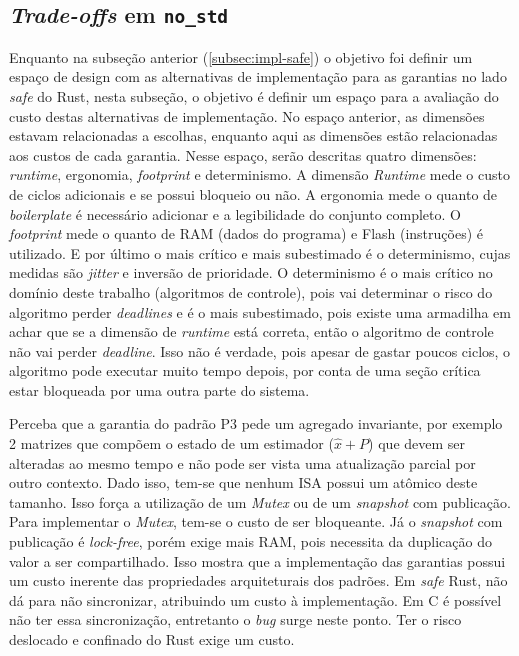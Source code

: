 \subsection{\textit{Trade-offs} em \texttt{no\_std}}
\label{subsec:cost-impl}

Enquanto na subseção anterior (\ref{subsec:impl-safe}) o objetivo foi definir um espaço de design com as alternativas de implementação para as garantias no lado \textit{safe} do Rust, nesta subseção, o objetivo é definir um espaço para a avaliação do custo destas alternativas de implementação. No espaço anterior, as dimensões estavam relacionadas a escolhas, enquanto aqui as dimensões estão relacionadas aos custos de cada garantia. Nesse espaço, serão descritas quatro dimensões: \textit{runtime}, ergonomia, \textit{footprint} e determinismo. A dimensão \textit{Runtime} mede o custo de ciclos adicionais e se possui bloqueio ou não. A ergonomia mede o quanto de \textit{boilerplate} é necessário adicionar e a legibilidade do conjunto completo. O \textit{footprint} mede o quanto de \ac{RAM} (dados do programa) e Flash (instruções) é utilizado. E por último o mais crítico e mais subestimado é o determinismo, cujas medidas são \textit{jitter} e inversão de prioridade. O determinismo é o mais crítico no domínio deste trabalho (algoritmos de controle), pois vai determinar o risco do algoritmo perder \textit{deadlines} e é o mais subestimado, pois existe uma armadilha em achar que se a dimensão de \textit{runtime} está correta, então o algoritmo de controle não vai perder \textit{deadline}. Isso não é verdade, pois apesar de gastar poucos ciclos, o algoritmo pode executar muito tempo depois, por conta de uma seção crítica estar bloqueada por uma outra parte do sistema.

Perceba que a garantia do padrão P3 pede um agregado invariante, por exemplo 2 matrizes que compõem o estado de um estimador ($\hat{x} + P$) que devem ser alteradas ao mesmo tempo e não pode ser vista uma atualização parcial por outro contexto. Dado isso, tem-se que nenhum \ac{ISA} possui um atômico deste tamanho. Isso força a utilização de um \textit{Mutex} ou de um \textit{snapshot} com publicação. Para implementar o \textit{Mutex}, tem-se o custo de ser bloqueante. Já o \textit{snapshot} com publicação é \textit{lock-free}, porém exige mais \ac{RAM}, pois necessita da duplicação do valor a ser compartilhado. Isso mostra que a implementação das garantias possui um custo inerente das propriedades arquiteturais dos padrões. Em \textit{safe} Rust, não dá para não sincronizar, atribuindo um custo à implementação. Em C é possível não ter essa sincronização, entretanto o \textit{bug} surge neste ponto. Ter o risco deslocado e confinado do Rust exige um custo.

